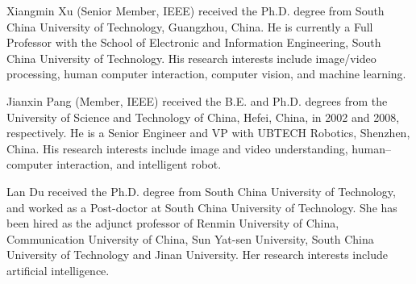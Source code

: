 \documentclass[lettersize,journal]{IEEEtran}
\begin{document}
\vspace{11pt}
\vspace{-33pt}
\begin{IEEEbiography}{Xiangmin Xu} (Senior Member, IEEE) received the Ph.D. degree from South China University of Technology, Guangzhou, China. He is currently a Full Professor with the School of Electronic and Information Engineering, South China University of Technology. His research interests include image/video processing, human computer interaction, computer vision, and machine learning.
\end{IEEEbiography}

\vspace{11pt}
\vspace{-33pt}
\begin{IEEEbiography}{Jianxin Pang} (Member, IEEE) received the B.E. and Ph.D. degrees from the University of Science and Technology of China, Hefei, China, in 2002 and 2008, respectively. He is a Senior Engineer and VP with UBTECH Robotics, Shenzhen, China. His research interests include image and video understanding, human–computer interaction, and intelligent robot.

\end{IEEEbiography}

\vspace{11pt}
\vspace{-33pt}
\begin{IEEEbiography}{Lan Du} received the Ph.D. degree from South China University of Technology, and worked as a Post-doctor at South China University of Technology. She has been hired as the adjunct professor of Renmin University of China, Communication University of China, Sun Yat-sen University, South China University of Technology and Jinan University. Her research interests include artificial intelligence.
\end{IEEEbiography}

\vfill
\end{document}
